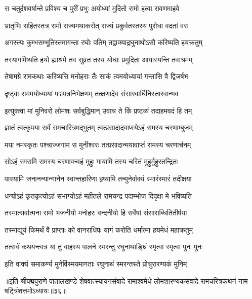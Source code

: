 \twolineshloka
{स चतुर्दशवर्षान्ते प्रविश्य च पुरीं प्रभुः}
{अयोध्यां मुदितो रामो हत्वा रावणमाहवे}%

\twolineshloka
{भ्रातृभिः सहितस्तत्र रामो राज्यमथाकरोत्}
{राज्यं प्रकुर्वतस्तस्य पुरोधा वदतां वरः}%

\twolineshloka
{अगस्त्यः कुम्भसम्भूतिस्तमागन्ता रघोः पतिम्}
{तद्वाक्याद्रघुनाथोऽसौ करिष्यति हयक्रतुम्}%

\twolineshloka
{तस्यागमिष्यति हयो ह्याश्रमे तव सुव्रत}
{तस्य योधाः प्रमुदिता आयास्यन्ति तवाश्रमम्}%

\twolineshloka
{तेषामग्रे रामकथाः करिष्यसि मनोहराः}
{तैः साकं त्वमयोध्यायां गन्तासि वै द्विजर्षभ}%

\twolineshloka
{दृष्ट्वा राममयोध्यायां पद्मपत्रनिभेक्षणम्}
{तत्क्षणादेव संसारवार्धिनिस्तारवान्भव}%

\twolineshloka
{इत्युक्त्वा मां मुनिवरो लोमशः सर्वबुद्धिमान्}
{उवाच ते किं प्रष्टव्यं तदाहमवदं हि तम्}%

\twolineshloka
{ज्ञातं त्वत्कृपया सर्वं रामचारित्रमद्भुतम्}
{त्वत्प्रसादादवाप्स्येऽहं रामस्य चरणाम्बुजम्}%

\twolineshloka
{मया नमस्कृतः पश्चाज्जगाम स मुनीश्वरः}
{तत्प्रसादान्मयावाप्तं रामस्य चरणार्चनम्}%

\twolineshloka
{सोऽहं स्मरामि रामस्य चरणावन्वहं मुहुः}
{गायामि तस्य चरितं मुहुर्मुहुरतन्द्रितः}%

\twolineshloka
{पावयामि जनानन्यान्गानेन स्वान्तहारिणा}
{हृष्यामि तन्मुनेर्वाक्यं स्मारंस्मारं तदीक्षया}%

\twolineshloka
{धन्योऽहं कृतकृत्योऽहं सभाग्योऽहं महीतले}
{रामचन्द्र पदाम्भोज दिदृक्षा मे भविष्यति}%

\twolineshloka
{तस्मात्सर्वात्मना रामो भजनीयो मनोहरः}
{वन्दनीयो हि सर्वेषां संसाराब्धितितीर्षया}%

\twolineshloka
{तस्माद्यूयं किमर्थं वै प्राप्ताः को वानराधिपः}
{यागं करोति धर्मात्मा हयमेधं महाक्रतुम्}%

\twolineshloka
{तत्सर्वं कथयन्त्वत्र यां तु वाहस्य पालने}
{स्मरन्तु रघुनाथाङ्घ्रिं स्मृत्वा स्मृत्वा पुनः पुनः}%

\twolineshloka
{इति वाक्यं समाकर्ण्य मुनेर्विस्मयमागताः}
{रघुनाथं स्मरन्तस्ते प्रोचुरारण्यकं मुनिम्}%

{॥इति श्रीपद्मपुराणे पातालखण्डे शेषवात्स्यायनसंवादे रामाश्वमेधे लोमशारण्यकसंवादे रामचरित्रकथनं नाम षट्त्रिंशत्तमोऽध्यायः॥३६॥}



